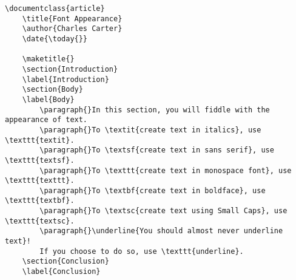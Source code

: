         \begin{verbatim}
\documentclass{article}
    \title{Font Appearance}
    \author{Charles Carter}
    \date{\today{}}
 
    \maketitle{}
    \section{Introduction}
    \label{Introduction}
    \section{Body}
    \label{Body}
        \paragraph{}In this section, you will fiddle with the appearance of text. 
        \paragraph{}To \textit{create text in italics}, use \texttt{textit}. 
        \paragraph{}To \textsf{create text in sans serif}, use \texttt{textsf}. 
        \paragraph{}To \texttt{create text in monospace font}, use \texttt{texttt}. 
        \paragraph{}To \textbf{create text in boldface}, use \texttt{textbf}. 
        \paragraph{}To \textsc{create text using Small Caps}, use \texttt{textsc}. 
        \paragraph{}\underline{You should almost never underline text}! 
        If you choose to do so, use \texttt{underline}.
    \section{Conclusion}
    \label{Conclusion}
    
        \end{verbatim}

